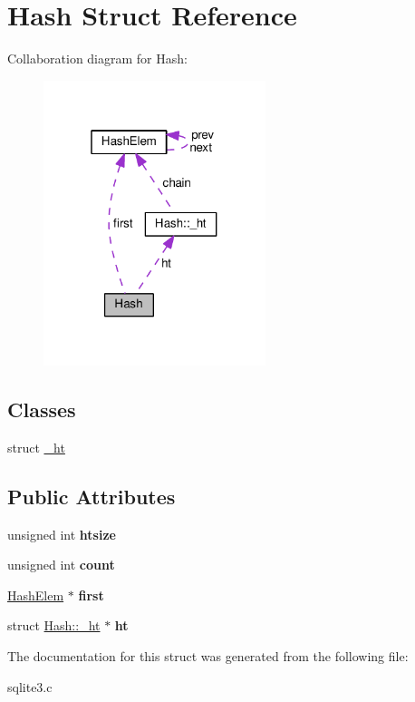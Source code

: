 \hypertarget{structHash}{}\section{Hash Struct Reference}
\label{structHash}


Collaboration diagram for Hash\+:\nopagebreak
\begin{figure}[H]
\begin{center}
\leavevmode
\includegraphics[width=184pt]{structHash__coll__graph}
\end{center}
\end{figure}
\subsection*{Classes}
\begin{DoxyCompactItemize}
\item 
struct \hyperlink{structHash_1_1__ht}{\+\_\+ht}
\end{DoxyCompactItemize}
\subsection*{Public Attributes}
\begin{DoxyCompactItemize}
\item 
unsigned int {\bfseries htsize}\hypertarget{structHash_a072258e24a38e09175f1308deb013bc8}{}\label{structHash_a072258e24a38e09175f1308deb013bc8}

\item 
unsigned int {\bfseries count}\hypertarget{structHash_a7ab16f173cdc347ffbe39eaa85ee6fda}{}\label{structHash_a7ab16f173cdc347ffbe39eaa85ee6fda}

\item 
\hyperlink{structHashElem}{Hash\+Elem} $\ast$ {\bfseries first}\hypertarget{structHash_a2cfc9936ca2a624c6492ab6557f4705b}{}\label{structHash_a2cfc9936ca2a624c6492ab6557f4705b}

\item 
struct \hyperlink{structHash_1_1__ht}{Hash\+::\+\_\+ht} $\ast$ {\bfseries ht}\hypertarget{structHash_ac0f36e03746a3fe69643db08d93bc0c4}{}\label{structHash_ac0f36e03746a3fe69643db08d93bc0c4}

\end{DoxyCompactItemize}


The documentation for this struct was generated from the following file\+:\begin{DoxyCompactItemize}
\item 
sqlite3.\+c\end{DoxyCompactItemize}
